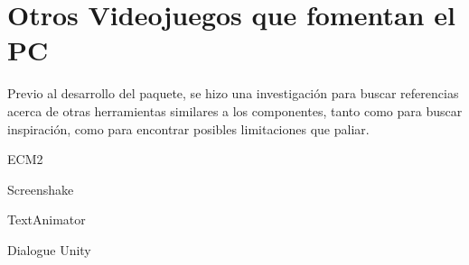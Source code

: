 \section{Otros Videojuegos que fomentan el PC}
Previo al desarrollo del paquete, se hizo una investigación para buscar referencias acerca de otras herramientas similares a los componentes,
 tanto como para buscar inspiración, como para encontrar posibles limitaciones que paliar. 

ECM2\cite{ECM2}

Screenshake\cite{Screenshake}

TextAnimator\cite{TextAnimator}

Dialogue Unity\cite{dialogueUnity}